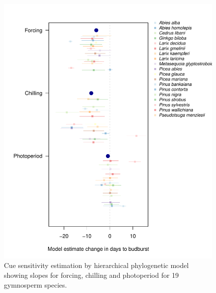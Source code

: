 \documentclass{article}\usepackage[]{graphicx}\usepackage[]{color}
\begin{document}
\begin{figure} [H]
  \begin{center}
  \includegraphics[width=14cm]{..//..//analyses/phylogeny/figures/muplot_gymnosperm.pdf}
  \caption{Cue sensitivity estimation by hierarchical phylogenetic model showing slopes for forcing, chilling and photoperiod for 19 gymnosperm species.}
  \label{fig:muplot_gymno}
  \end{center}
\end{figure}
\end{document}
